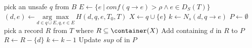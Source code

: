 \begin{algorithm}
\caption{$\SanitizeBuffer(T_0, T, B, H)$}
\label{algo:sanitize}
\begin{algorithmic}[1]
\REPEAT
\label{algo:pick_rs}
    \STATE pick an unsafe \qid $q$ from $B$
    \STATE $E \gets \{e ~|~ conf(q \rightarrow e) > \rho \land  e \in D_S(T)\}$
        \STATE $(d, e) \gets\underset{d\in q\cup E, q, e \in E}{\arg\max}\, H(d, q, e, T_0, T)$
    \STATE $X\leftarrow q\cup\{e\}$
    \STATE $k\leftarrow N_s(d,q \rightarrow e)$\label{line:sanitize-k}
    \STATE $P\leftarrow \emptyset$
    \label{line:sanitize-whilek}
        \STATE pick a record $R$ from $T$ where
		$R\subseteq \container(X)$ \label{pick_row}
        \STATE Add \qids containing $d$ in $R$ to $P$
        \STATE $R\leftarrow R-\{d\}$\label{line:sanitize-suppress}
        \label{algo:update_kl}
        \STATE $k \leftarrow k-1$
    \ENDWHILE
    \STATE Update $sup$ of \qids in $P$
   \label{algo:pick_re}
\end{algorithmic}
\end{algorithm}

%
%

